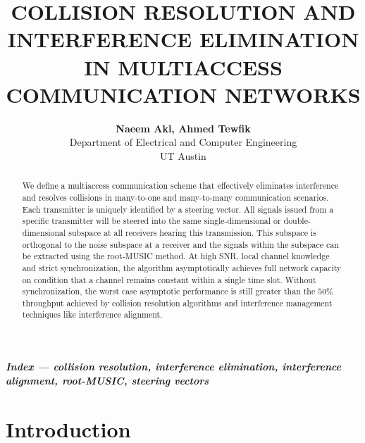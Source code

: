 \documentclass[10pt, a4paper, twocolumn]{IEEEtran}
\begin{document}
\title{\Large{COLLISION RESOLUTION AND INTERFERENCE ELIMINATION IN MULTIACCESS COMMUNICATION NETWORKS}}

\author{{\bf Naeem Akl, Ahmed Tewfik} \vspace{0.2cm} \\
Department of Electrical and Computer Engineering\\
UT Austin\\
\vspace{-0.78cm}}

\maketitle

\thispagestyle{empty}


\begin{abstract}
We define a multiaccess communication scheme that effectively eliminates interference and resolves collisions in many-to-one and many-to-many communication scenarios. Each transmitter is uniquely identified by a steering vector. All signals issued from a specific transmitter will be steered into the same single-dimensional or double-dimensional subspace at all receivers hearing this transmission. This subspace is orthogonal to the noise subspace at a receiver and the signals within the subspace can be extracted using the root-MUSIC method. At high SNR, local channel knowledge and strict synchronization, the algorithm asymptotically achieves full network capacity on condition that a channel remains constant within a single time slot. Without synchronization, the worst case asymptotic performance is still greater than the $50\%$ throughput achieved by collision resolution algorithms and interference management techniques like interference alignment. 

\end{abstract}
\textit{\textbf{Index --- collision resolution, interference elimination, interference alignment, root-MUSIC, steering vectors}} 

\section{Introduction}
  
\end{document}
